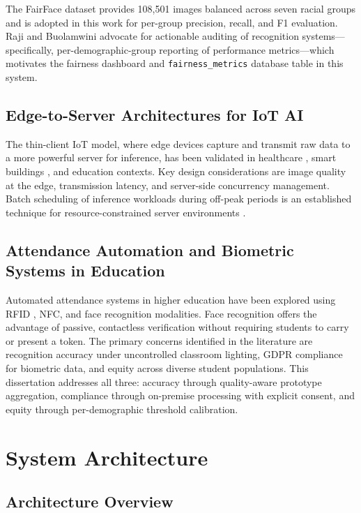 \documentclass[12pt,a4paper]{report}
\begin{document}
The FairFace dataset \cite{karkkainen2021fairface} provides 108,501 images balanced across seven racial groups and is adopted in this work for per-group precision, recall, and F1 evaluation. Raji and Buolamwini \cite{raji2019actionable} advocate for actionable auditing of recognition systems—specifically, per-demographic-group reporting of performance metrics—which motivates the fairness dashboard and \texttt{fairness\_metrics} database table in this system.

\section{Edge-to-Server Architectures for IoT AI}
The thin-client IoT model, where edge devices capture and transmit raw data to a more powerful server for inference, has been validated in healthcare \cite{li2020iot}, smart buildings \cite{chen2019iot}, and education \cite{rahman2020iot} contexts. Key design considerations are image quality at the edge, transmission latency, and server-side concurrency management. Batch scheduling of inference workloads during off-peak periods is an established technique for resource-constrained server environments \cite{zhang2019batch}.

\section{Attendance Automation and Biometric Systems in Education}
Automated attendance systems in higher education have been explored using RFID \cite{rahman2020iot}, NFC, and face recognition modalities. Face recognition offers the advantage of passive, contactless verification without requiring students to carry or present a token. The primary concerns identified in the literature are recognition accuracy under uncontrolled classroom lighting, GDPR compliance for biometric data, and equity across diverse student populations. This dissertation addresses all three: accuracy through quality-aware prototype aggregation, compliance through on-premise processing with explicit consent, and equity through per-demographic threshold calibration.

\chapter{System Architecture}

\section{Architecture Overview}
\end{document}
